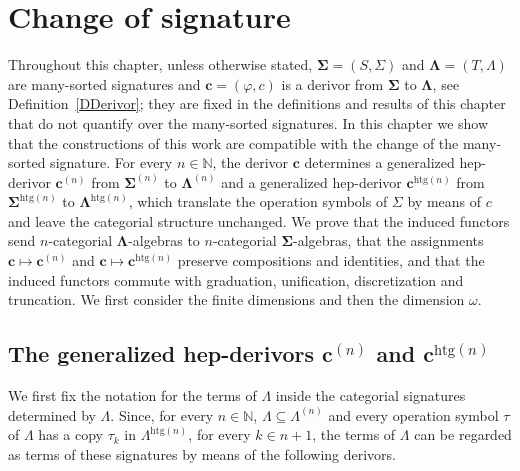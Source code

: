 \documentclass[a4paper, reqno]{amsbook}
\newcommand{\sig}[1]{\mathbf{#1}}             %
\newcommand{\htg}{\mathrm{htg}}                %
\theoremstyle{plain}
\theoremstyle{definition}
\begin{document}
\chapter{Change of signature}\label{SChangeSig}

Throughout this chapter, unless otherwise stated, $\sig{\Sigma}=(S,\Sigma)$ and $\sig{\Lambda}=(T,\Lambda)$ are many-sorted signatures and $\mathbf{c}=(\varphi,c)$ is a derivor from $\sig{\Sigma}$ to $\sig{\Lambda}$, see Definition~\ref{DDerivor}; they are fixed in the definitions and results of this chapter that do not quantify over the many-sorted signatures.
In this chapter we show that the constructions of this work are compatible with the change of the many-sorted signature.
For every $n\in\mathbb{N}$, the derivor $\mathbf{c}$ determines a generalized hep-derivor $\mathbf{c}^{(n)}$ from $\sig{\Sigma}^{(n)}$ to $\sig{\Lambda}^{(n)}$ and a generalized hep-derivor $\mathbf{c}^{\htg(n)}$ from $\sig{\Sigma}^{\htg(n)}$ to $\sig{\Lambda}^{\htg(n)}$, which translate the operation symbols of $\Sigma$ by means of $c$ and leave the categorial structure unchanged.
We prove that the induced functors send $n$-categorial $\sig{\Lambda}$-algebras to $n$-categorial $\sig{\Sigma}$-algebras, that the assignments $\mathbf{c}\mapsto\mathbf{c}^{(n)}$ and $\mathbf{c}\mapsto\mathbf{c}^{\htg(n)}$ preserve compositions and identities, and that the induced functors commute with graduation, unification, discretization and truncation.
We first consider the finite dimensions and then the dimension $\omega$.

\section{The generalized hep-derivors \texorpdfstring{$\mathbf{c}^{(n)}$ and $\mathbf{c}^{\htg(n)}$}{c(n) and chtg(n)}}\label{SChangeSigDerivors}

We first fix the notation for the terms of $\Lambda$ inside the categorial signatures determined by $\Lambda$.
Since, for every $n\in\mathbb{N}$, $\Lambda\subseteq\Lambda^{(n)}$ and every operation symbol $\tau$ of $\Lambda$ has a copy $\tau_{k}$ in $\Lambda^{\htg(n)}$, for every $k\in n+1$, the terms of $\Lambda$ can be regarded as terms of these signatures by means of the following derivors.
\end{document}
